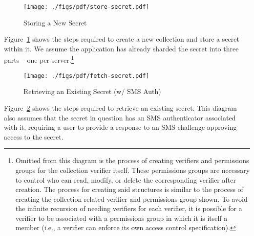 \begin{figure}[th]
  \centering
  \texttt{[image: ./figs/pdf/store-secret.pdf]}
  \caption{Storing a New Secret}
  \label{fig:tutamen:storesecret}
\end{figure}

Figure~\ref{fig:tutamen:storesecret} shows the steps required to
create a new collection and store a secret within it. We assume the
application has already sharded the secret into three parts -- one per
server.\footnote{Omitted from this diagram is the process of creating
  verifiers and permissions groups for the collection verifier
  itself. These permissions groups are necessary to control who can
  read, modify, or delete the corresponding verifier after
  creation. The process for creating said structures is similar to the
  process of creating the collection-related verifier and permissions
  group shown. To avoid the infinite recursion of needing verifiers
  for each verifier, it is possible for a verifier to be associated
  with a permissions group in which it is itself a member (i.e., a
  verifier can enforce its own access control specification).}

\begin{figure}[th]
  \centering
  \texttt{[image: ./figs/pdf/fetch-secret.pdf]}
  \caption{Retrieving an Existing Secret (w/ SMS Auth)}
  \label{fig:tutamen:fetchsecret}
\end{figure}

Figure~\ref{fig:tutamen:fetchsecret} shows the steps required to
retrieve an existing secret. This diagram also assumes that the secret
in question has an SMS authenticator associated with it, requiring a
user to provide a response to an SMS challenge approving access to the
secret.


